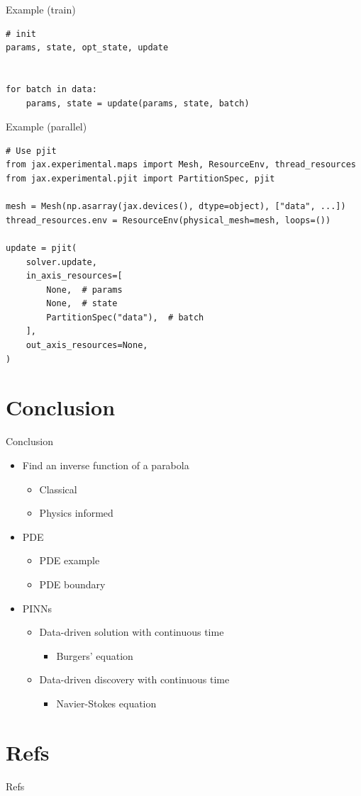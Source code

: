 \documentclass[aspectratio=1610,xcolor={dvipsnames},hyperref={colorlinks,unicode,linkcolor=violet,anchorcolor=BlueViolet,citecolor=YellowOrange,filecolor=black,urlcolor=Aquamarine}]{beamer}
\begin{document}
\begin{frame}[label={sec:org86d3bb6},fragile]{Example (train)}
 \begin{verbatim}
# init
params, state, opt_state, update


for batch in data:
    params, state = update(params, state, batch)
\end{verbatim}
\end{frame}

\begin{frame}[label={sec:org3084c38},fragile]{Example (parallel)}
 \begin{verbatim}
# Use pjit
from jax.experimental.maps import Mesh, ResourceEnv, thread_resources
from jax.experimental.pjit import PartitionSpec, pjit

mesh = Mesh(np.asarray(jax.devices(), dtype=object), ["data", ...])
thread_resources.env = ResourceEnv(physical_mesh=mesh, loops=())

update = pjit(
    solver.update,
    in_axis_resources=[
        None,  # params
        None,  # state
        PartitionSpec("data"),  # batch
    ],
    out_axis_resources=None,
)
\end{verbatim}
\end{frame}

\section{Conclusion}
\label{sec:org21faefe}

\begin{frame}[label={sec:orgb0d717a}]{Conclusion}
\begin{itemize}
\item Find an inverse function of a parabola
\begin{itemize}
\item Classical
\item Physics informed
\end{itemize}
\item PDE
\begin{itemize}
\item PDE example
\item PDE boundary
\end{itemize}
\item PINNs
\begin{itemize}
\item Data-driven solution with continuous time
\begin{itemize}
\item Burgers' equation
\end{itemize}
\item Data-driven discovery with continuous time
\begin{itemize}
\item Navier-Stokes equation
\end{itemize}
\end{itemize}
\end{itemize}
\end{frame}

\section{Refs}
\label{sec:org93842f9}

\begin{frame}[allowframebreaks]{Refs}


\end{frame}
\end{document}
